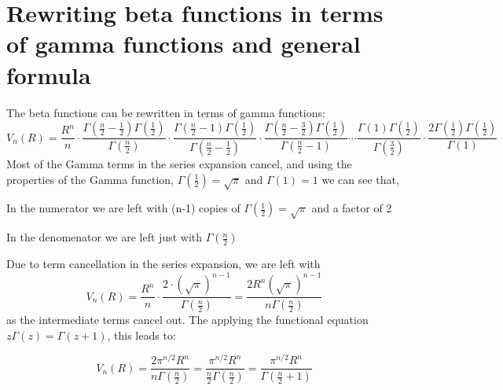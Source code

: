 \documentclass{article}
\begin{document}
\section*{Rewriting beta functions in terms of gamma functions and general formula}
The beta functions can be rewritten in terms of gamma functions:
\[
V_n(R)=\frac{R^n}{n} \cdot \frac{\Gamma(\frac{n}{2}-\frac{1}{2})\Gamma(\frac{1}{2})}{\Gamma(\frac{n}{2})} \cdot \frac{\Gamma(\frac{n}{2}-1)\Gamma(\frac{1}{2})}{\Gamma(\frac{n}{2}-\frac{1}{2})} \cdot \frac{\Gamma(\frac{n}{2}-\frac{3}{2})\Gamma(\frac{1}{2})}{\Gamma(\frac{n}{2}-1)} \cdots \frac{\Gamma(1)\Gamma(\frac{1}{2})}{\Gamma(\frac{3}{2})} \cdot \frac{2\Gamma(\frac{1}{2})\Gamma(\frac{1}{2})}{\Gamma(1)}
\]
Most of the Gamma terms in the series expansion cancel, and using the properties of the Gamma function, $\Gamma(\tfrac{1}{2}) = \sqrt{\pi}$ and $\Gamma(1) = 1$ we can see that,

In the numerator we are left with (n-1) copies of $\Gamma(\frac{1}{2}) = \sqrt{\pi}$ and a factor of 2

In the denomenator we are left just with $\Gamma(\frac{n}{2})$

Due to term cancellation in the series expansion, we are left with \[V_n(R)=
\frac{R^n}{n} \cdot \frac{2\cdot(\sqrt{\pi})^{n-1}}{\Gamma(\frac{n}{2})} = \frac{2R^n(\sqrt{\pi})^{n-1}}{n\Gamma(\frac{n}{2})}
\] as the intermediate terms cancel out.  The applying the functional equation $z\Gamma(z) = \Gamma(z + 1)$, this leads to:

\[
V_n(R)=\frac{2\pi^{n/2}R^n}{n\Gamma(\frac{n}{2})}=\frac{\pi^{n/2}R^n}{\frac{n}{2}\Gamma(\frac{n}{2})}=\frac{\pi^{n/2}R^n}{\Gamma(\frac{n}{2}+1)}
\]
\end{document}
